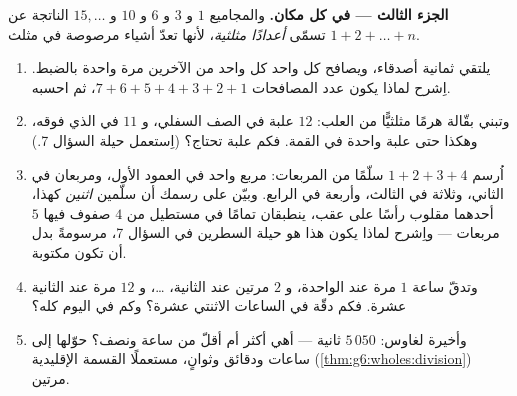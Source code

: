 \begin{problem}
\medskip
\noindent\textbf{الجزء الثالث ---  في كل مكان.}
والمجاميع $1$ و $3$ و $6$ و $10$ و $15, \dots$ الناتجة عن
$1 + 2 + \dots + n$ تسمّى \emph{أعدادًا
مثلثية}، لأنها تعدّ أشياء
مرصوصة في مثلث.
\begin{enumerate}[resume]
  \item يلتقي ثمانية أصدقاء، ويصافح كل واحد كل واحد من الآخرين
        مرة واحدة بالضبط. اِشرح لماذا يكون عدد
        المصافحات $7 + 6 + 5 + 4 + 3 + 2 + 1$، ثم احسبه.
  \item وتبني بقّالة هرمًا مثلثيًّا من العلب: $12$ علبة في
        الصف السفلي، و $11$ في الذي فوقه، وهكذا حتى علبة
        واحدة في القمة. فكم علبة تحتاج؟ (اِستعمل حيلة
        السؤال 7.)
  \item اُرسم  $1 + 2 + 3 + 4$ سلّمًا من المربعات:
        مربع واحد في العمود الأول، ومربعان في الثاني، وثلاثة
        في الثالث، وأربعة في الرابع. وبيّن على رسمك
        أن سلّمين \emph{اثنين} كهذا، أحدهما مقلوب رأسًا
        على عقب، ينطبقان تمامًا في مستطيل من $4$ صفوف
        فيها $5$ مربعات --- واِشرح لماذا يكون هذا هو حيلة
        السطرين في السؤال 7، مرسومةً بدل أن تكون مكتوبة.
  \item وتدقّ ساعة $1$ مرة عند الواحدة، و $2$ مرتين عند
        الثانية، \dots، و $12$ مرة عند الثانية عشرة. فكم
        دقّة في الساعات الاثنتي عشرة؟ وكم في اليوم
        كله؟
  \item وأخيرة لغاوس: $5\,050$ ثانية --- أهي أكثر أم
        أقلّ من ساعة ونصف؟ حوّلها إلى ساعات ودقائق
        وثوانٍ، مستعملًا القسمة الإقليدية
        (\cref{thm:g6:wholes:division}) مرتين.
\end{enumerate}
\end{problem}
